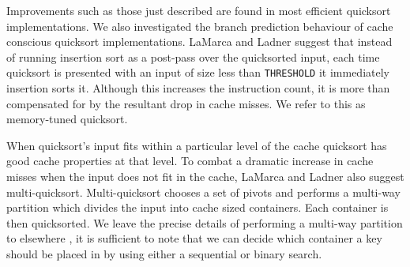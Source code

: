 \documentclass[acmtocl]{acmtrans2m}
\begin{document}
Improvements such as those just described are found in most efficient quicksort
implementations. We also investigated the branch prediction behaviour of cache
conscious quicksort implementations. LaMarca and Ladner \citeyear{LaMarca97} suggest that instead of running
insertion sort as a post-pass over the quicksorted input, each time quicksort
is presented with an input of size less than \texttt{THRESHOLD} it immediately
insertion sorts it. Although this increases the instruction count, it is more
than compensated for by the resultant drop in cache misses. We refer to this
as memory-tuned quicksort.

When quicksort's input fits within a particular level of the cache quicksort
has good cache properties at that level. To combat a dramatic increase
in cache misses when the input does not fit in the cache, LaMarca and Ladner also suggest multi-quicksort. 
Multi-quicksort chooses a set of pivots and performs a multi-way partition which divides the input into
cache sized containers. Each container is then quicksorted. We leave
the precise details of performing a multi-way partition to elsewhere \cite{LaMarca96a,BiggarGregg05}, it is sufficient
to note that we can decide which container a key should be placed in by using either a sequential
or binary search.
\end{document}
